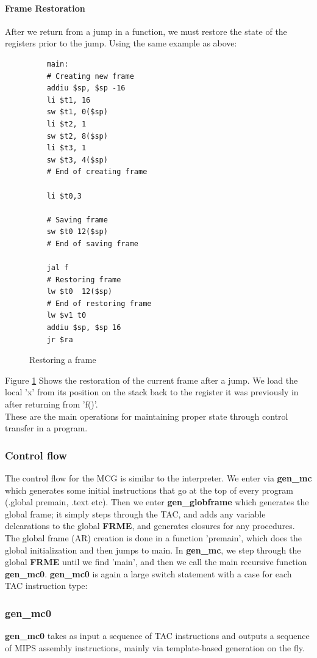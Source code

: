 \documentclass[12pt]{article}
\begin{document}
\paragraph{Frame Restoration} After we return from a jump in a function, we must restore the state of the registers prior to the jump. Using the same example as above: 
\begin{figure}[H]
  \begin{verbatim}
    main:
    # Creating new frame
    addiu $sp, $sp -16
    li $t1, 16
    sw $t1, 0($sp)
    li $t2, 1
    sw $t2, 8($sp)
    li $t3, 1
    sw $t3, 4($sp)
    # End of creating frame

    li $t0,3

    # Saving frame
    sw $t0 12($sp)
    # End of saving frame

    jal f
    # Restoring frame
    lw $t0  12($sp)
    # End of restoring frame
    lw $v1 t0
    addiu $sp, $sp 16
    jr $ra
  \end{verbatim}
  \caption{Restoring a frame}
  \label{rstfrme}
\end{figure}
Figure \ref{rstfrme} Shows the restoration of the current frame after a jump. We load the local 'x' from its position on the stack back to the register it was previously in after returning from 'f()'. \\\newline
These are the main operations for maintaining proper state through control transfer in a program.
\subsubsection{Control flow}
The control flow for the MCG is similar to the interpreter. We enter via \textbf{gen\_mc} which generates some initial instructions that go at the top of every program (.global premain, .text etc). Then we enter \textbf{gen\_globframe} which generates the global frame; it simply steps through the TAC, and adds any variable delcarations to the global \textbf{FRME}, and generates closures for any procedures. The global frame (AR) creation is done in a function 'premain', which does the global initialization and then jumps to main. In \textbf{gen\_mc}, we step through the global \textbf{FRME} until we find 'main', and then we call the main recursive function \textbf{gen\_mc0}.  \textbf{gen\_mc0} is again a large switch statement with a case for each TAC instruction type: 
\subsubsection{gen\_mc0}\label{genmc0}
\textbf{gen\_mc0} takes as input a sequence of TAC instructions and outputs a sequence of MIPS assembly instructions, mainly via template-based generation on the fly. 
\end{document}
